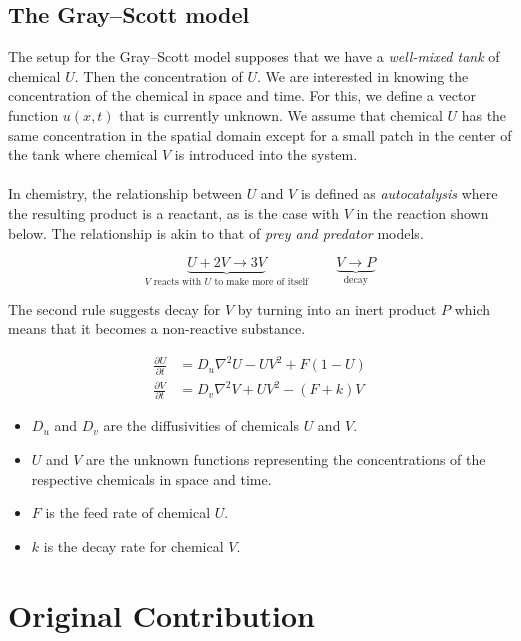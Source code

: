 \documentclass[a4paper, 11pt]{article}
\begin{document}
\subsection{The Gray--Scott model}
\label{sec:gray-scott}

The setup for the Gray--Scott model supposes that we have a \emph{well-mixed tank} of chemical $U$. Then the concentration of $U$. We are interested in knowing the concentration of the chemical in space and time. For this, we define a vector function $u(x, t)$  that is currently unknown. We assume that chemical $U$ has the same concentration in the spatial domain except for a small patch in the center of the tank where chemical $V$ is introduced into the system. \\
\\
In chemistry, the relationship between $U$ and $V$ is defined as \textit{autocatalysis} where the resulting product is a reactant, as is the case with $V$ in the reaction shown below. The relationship is akin to that of \textit{prey and predator} models.

\begin{equation*}
	\underbrace{U + 2V \to 3V}_{\text{$V$ reacts with $U$ to make more of itself}}
	\qquad
	\underbrace{V \to P}_{\text{decay}}
\end{equation*}


The second rule suggests decay for $V$ by turning into an inert product $P$ which means that it becomes a non-reactive substance.


\begin{align*}
	\frac{\partial U}{\partial t} & = D_u \nabla^2 U - UV^2 + F(1 - U) \\
	\frac{\partial V}{\partial t} & = D_v \nabla^2 V + UV^2 - (F + k)V
\end{align*}
\begin{itemize}
	\item $D_u$ and $D_v$ are the diffusivities of chemicals $U$ and $V$.
	\item $U$ and $V$ are the unknown functions representing the concentrations of the respective chemicals in space and time.
	\item $F$ is the feed rate of chemical $U$.
	\item $k$ is the decay rate for chemical $V$.
\end{itemize}



\section{Original Contribution}
\end{document}
